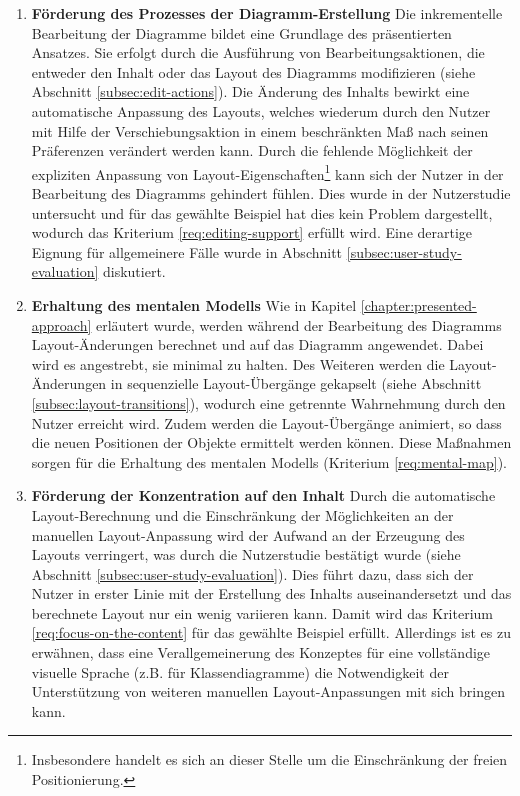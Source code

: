 \begin{enumerate}[label={K.\arabic*}]
\item
\label{eval:editing-support}
\textbf{Förderung des Prozesses der Diagramm-Erstellung}
Die inkrementelle Bearbeitung der Diagramme bildet eine Grundlage des präsentierten Ansatzes. Sie erfolgt durch die Ausführung von Bearbeitungsaktionen, die entweder den Inhalt oder das Layout des Diagramms modifizieren (siehe Abschnitt \ref{subsec:edit-actions}). Die Änderung des Inhalts bewirkt eine automatische Anpassung des Layouts, welches wiederum durch den Nutzer mit Hilfe der Verschiebungsaktion in einem beschränkten Maß nach seinen Präferenzen verändert werden kann. Durch die fehlende Möglichkeit der expliziten Anpassung von Layout-Eigenschaften\footnote{Insbesondere handelt es sich an dieser Stelle um die Einschränkung der freien Positionierung.} kann sich der Nutzer in der Bearbeitung des Diagramms gehindert fühlen. Dies wurde in der Nutzerstudie untersucht und für das gewählte Beispiel hat dies kein Problem dargestellt, wodurch das Kriterium \ref{req:editing-support} erfüllt wird. Eine derartige Eignung für allgemeinere Fälle wurde in Abschnitt \ref{subsec:user-study-evaluation} diskutiert.

\newpage

\item
\label{eval:mental-map}
\textbf{Erhaltung des mentalen Modells}
Wie in Kapitel \ref{chapter:presented-approach} erläutert wurde, werden während der Bearbeitung des Diagramms Layout-Änderungen berechnet und auf das Diagramm angewendet. Dabei wird es angestrebt, sie minimal zu halten. Des Weiteren werden die Layout-Änderungen in sequenzielle Layout-Übergänge gekapselt (siehe Abschnitt \ref{subsec:layout-transitions}), wodurch eine getrennte Wahrnehmung durch den Nutzer erreicht wird. Zudem werden die Layout-Übergänge animiert, so dass die neuen Positionen der Objekte ermittelt werden können. Diese Maßnahmen sorgen für die Erhaltung des mentalen Modells (Kriterium \ref{req:mental-map}).

\item
\label{eval:focus-on-the-content}
\textbf{Förderung der Konzentration auf den Inhalt}
Durch die automatische Layout-Be\-rech\-nung und die Einschränkung der Möglichkeiten an der manuellen Layout-Anpassung wird der Aufwand an der Erzeugung des Layouts verringert, was durch die Nutzerstudie bestätigt wurde (siehe Abschnitt \ref{subsec:user-study-evaluation}). Dies führt dazu, dass sich der Nutzer in erster Linie mit der Erstellung des Inhalts auseinandersetzt und das berechnete Layout nur ein wenig variieren kann. Damit wird das Kriterium \ref{req:focus-on-the-content} für das gewählte Beispiel erfüllt. Allerdings ist es zu erwähnen, dass eine Verallgemeinerung des Konzeptes für eine vollständige visuelle Sprache (z.B. für Klassendiagramme) die Notwendigkeit der Unterstützung von weiteren manuellen Layout-Anpassungen mit sich bringen kann.


\end{enumerate}
